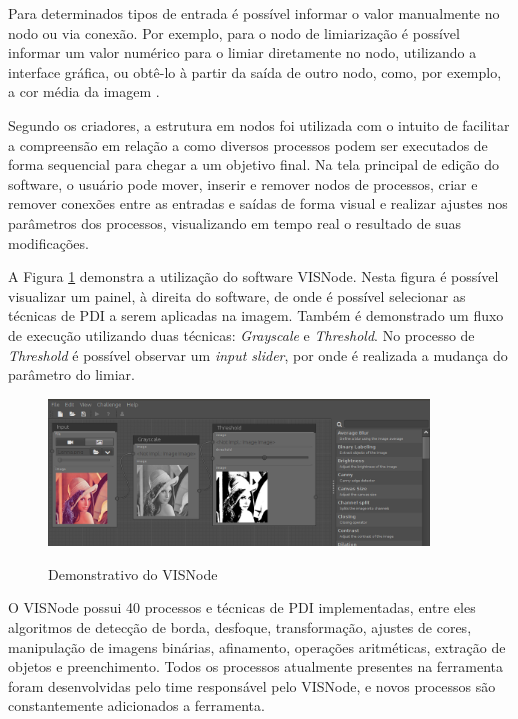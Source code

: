 \documentclass[
	12pt,				%
	oneside,			%
	a4paper,			%
	english,			%
	french,				%
	spanish,			%
	brazil,				%
	]{abntex2}
\newcommand{\vnNumeroTotalProcessos}{40}
\begin{document}
Para determinados tipos de entrada é possível informar o valor manualmente no nodo ou via conexão. Por exemplo, para o nodo de limiarização é possível informar um valor numérico para o limiar diretamente no nodo, utilizando a interface gráfica, ou obtê-lo à partir da saída de outro nodo, como, por exemplo, a cor média da imagem \cite{visnode}.

Segundo os criadores, a estrutura em nodos foi utilizada com o intuito de facilitar a compreensão em relação a como diversos processos podem ser executados de forma sequencial para chegar a um objetivo final. Na tela principal de edição do software, o usuário pode mover, inserir e remover nodos de processos, criar e remover conexões entre as entradas e saídas de forma visual e realizar ajustes nos parâmetros dos processos, visualizando em tempo real o resultado de suas modificações.

A Figura \ref{fig:visnode} demonstra a utilização do software VISNode. Nesta figura é possível visualizar um painel, à direita do software, de onde é possível selecionar as técnicas de PDI a serem aplicadas na imagem. Também é demonstrado um fluxo de execução utilizando duas técnicas: \textit{Grayscale} e \textit{Threshold}. No processo de \textit{Threshold} é possível observar um \textit{input slider}, por onde é realizada a mudança do parâmetro do limiar.

\begin{figure}[ht]
\centering
\caption{Demonstrativo do VISNode}
\includegraphics[width=0.9\textwidth]{imagens/visnode.png}
\sourceAuthor
\label{fig:visnode}
\end{figure}

O VISNode possui \vnNumeroTotalProcessos{} processos e técnicas de PDI implementadas, entre eles algoritmos de detecção de borda, desfoque, transformação, ajustes de cores, manipulação de imagens binárias, afinamento, operações aritméticas, extração de objetos e preenchimento. Todos os processos atualmente presentes na ferramenta foram desenvolvidas pelo time responsável pelo VISNode, e novos processos são constantemente adicionados a ferramenta.
\end{document}
